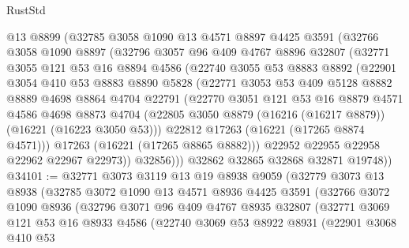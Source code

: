 \begin{lexlean}{RustStd}
\begin{coremodule}
      @13
      @8899
      (@32785
        @3058
        @1090
        @13
        @4571
        @8897
        @4425
        @3591
        (@32766
          @3058
          @1090
          @8897
          (@32796
            @3057
            @96
            @409
            @4767
            @8896
            @32807
            (@32771
              @3055
              @121
              @53
              @16
              @8894
              @4586
              (@22740
                @3055
                @53
                @8883
                @8892
                (@22901
                  @3054
                  @410
                  @53
                  @8883
                  @8890
                  @5828
                  (@22771
                    @3053
                    @53
                    @409
                    @5128
                    @8882
                    @8889
                    @4698
                    @8864
                    @4704
                    @22791
                    (@22770
                      @3051
                      @121
                      @53
                      @16
                      @8879
                      @4571
                      @4586
                      @4698
                      @8873
                      @4704
                      (@22805 @3050 @8879 (@16216 (@16217 @8879)) (@16221 (@16223 @3050 @53)))
                      @22812
                      @17263
                      (@16221 (@17265 @8874 @4571)))
                    @17263
                    (@16221 (@17265 @8865 @8882)))
                  @22952
                  @22955
                  @22958
                  @22962
                  @22967
                  @22973))
              @32856)))
        @32862
        @32865
        @32868
        @32871
        @19748))
@34101 := @32771
    @3073
    @3119
    @13
    @19
    @8938
    @9059
    (@32779
      @3073
      @13
      @8938
      (@32785
        @3072
        @1090
        @13
        @4571
        @8936
        @4425
        @3591
        (@32766
          @3072
          @1090
          @8936
          (@32796
            @3071
            @96
            @409
            @4767
            @8935
            @32807
            (@32771
              @3069
              @121
              @53
              @16
              @8933
              @4586
              (@22740
                @3069
                @53
                @8922
                @8931
                (@22901
                  @3068
                  @410
                  @53

\end{coremodule}
\end{lexlean}
